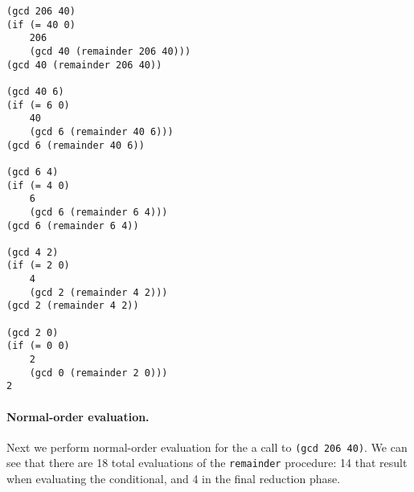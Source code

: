 \documentclass{article}
\begin{document}
\vspace{3mm}
\begin{lstlisting}[style=scheme]
(gcd 206 40)
(if (= 40 0)
    206
    (gcd 40 (remainder 206 40)))
(gcd 40 (remainder 206 40))

(gcd 40 6)
(if (= 6 0)
    40
    (gcd 6 (remainder 40 6)))
(gcd 6 (remainder 40 6))

(gcd 6 4)
(if (= 4 0)
    6
    (gcd 6 (remainder 6 4)))
(gcd 6 (remainder 6 4))

(gcd 4 2)
(if (= 2 0)
    4
    (gcd 2 (remainder 4 2)))
(gcd 2 (remainder 4 2))

(gcd 2 0)
(if (= 0 0)
    2
    (gcd 0 (remainder 2 0)))
2
\end{lstlisting}
\vspace{10mm}





\paragraph{Normal-order evaluation.}  Next we perform normal-order evaluation
for the a call to \lstinline{(gcd 206 40)}.  We can see that there are 18 total
evaluations of the \lstinline{remainder} procedure: 14 that result when
evaluating the conditional, and 4 in the final reduction phase.
\end{document}
